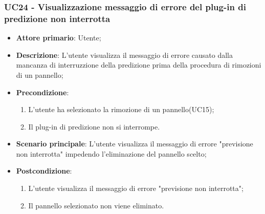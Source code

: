 \subsubsection{UC24 - Visualizzazione messaggio di errore del plug-in di predizione non interrotta}
\label{sssec:uc24}
\begin{itemize}
  \item \textbf{Attore primario}: Utente;
  \item \textbf{Descrizione}: L'utente visualizza il messaggio di errore causato dalla mancanza di interruzzione della predizione prima della procedura di rimozioni di un pannello;
  \item \textbf{Precondizione}:
  \begin{enumerate}
		\item L'utente ha selezionato la rimozione di un pannello(UC15);
		\item Il plug-in di predizione non si interrompe.
	\end{enumerate}
  \item \textbf{Scenario principale}: L'utente visualizza il messaggio di errore "previsione non interrotta" impedendo l'eliminazione del pannello scelto;
  \item \textbf{Postcondizione}:
  \begin{enumerate}
		\item L'utente visualizza il messaggio di errore "previsione non interrotta";
		\item Il pannello selezionato non viene eliminato.
	\end{enumerate}
\end{itemize}
